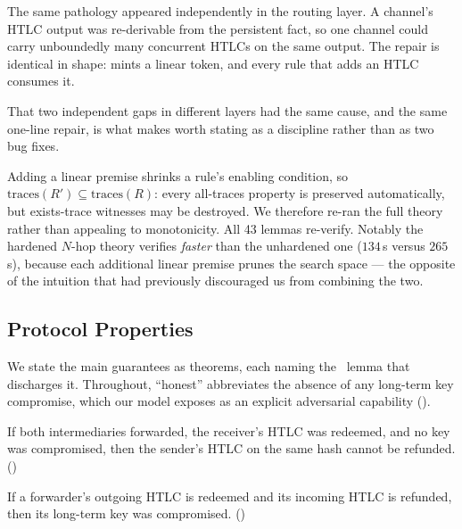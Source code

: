 The same pathology appeared independently in the routing layer. A channel's
HTLC output was re-derivable from the persistent  fact, so
one channel could carry unboundedly many concurrent HTLCs on the same output.
The repair is identical in shape:  mints a linear
 token, and every rule that adds an HTLC consumes it.

That two independent gaps in different layers had the same cause, and the same
one-line repair, is what makes  worth stating as a
discipline rather than as two bug fixes.

Adding a linear premise shrinks a rule's enabling condition, so
$\mathrm{traces}(R') \subseteq \mathrm{traces}(R)$: every all-traces property is
preserved automatically, but exists-trace witnesses may be destroyed. We
therefore re-ran the full theory rather than appealing to monotonicity. All 43
lemmas re-verify. Notably the hardened $N$-hop theory verifies \emph{faster}
than the unhardened one ($134$\,s versus $265$\,s), because each additional
linear premise prunes the search space --- the opposite of the intuition that
had previously discouraged us from combining the two.

\subsection{Protocol Properties}

We state the main guarantees as theorems, each naming the \mtamarin\ lemma that
discharges it. Throughout, ``honest'' abbreviates the absence of any long-term
key compromise, which our model exposes as an explicit adversarial capability
().

\begin{thrm}
\label{thm:atomicity}
If both intermediaries forwarded, the receiver's HTLC was redeemed, and no key
was compromised, then the sender's HTLC on the same hash cannot be refunded.
\hfill()
\end{thrm}

\begin{thrm}
\label{thm:intermediary}
If a forwarder's outgoing HTLC is redeemed and its incoming HTLC is refunded,
then its long-term key was compromised.
\hfill()
\end{thrm}

